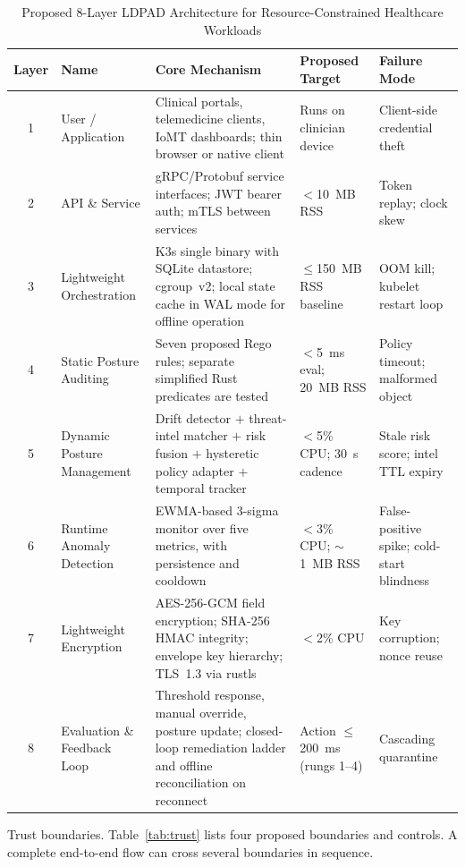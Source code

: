 \documentclass{ieeeaccess}
\renewcommand{\textbf}[1]{#1}
\begin{document}
\begin{table}[t]
\caption{Proposed 8-Layer LDPAD Architecture for Resource-Constrained Healthcare Workloads}
\label{tab:ldpadlayers}
\centering
\setlength{\tabcolsep}{4pt}
\begin{tabular}{|c|p{64pt}|p{118pt}|p{94pt}|p{62pt}|}
\hline
\textbf{Layer} & \textbf{Name} & \textbf{Core Mechanism} & \textbf{Proposed Target} & \textbf{Failure Mode} \\
\hline
1 & User / Application & Clinical portals, telemedicine clients, IoMT dashboards; thin browser or native client & Runs on clinician device & Client-side credential theft \\
\hline
2 & API \& Service & gRPC/Protobuf service interfaces; JWT bearer auth; mTLS between services & $<$10~MB RSS & Token replay; clock skew \\
\hline
3 & Lightweight Orchestration & K3s single binary with SQLite datastore; cgroup~v2; local state cache in WAL mode for offline operation & $\leq$150~MB RSS baseline & OOM kill; kubelet restart loop \\
\hline
4 & Static Posture Auditing & Seven proposed Rego rules; separate simplified Rust predicates are tested & $<$5~ms eval; 20~MB RSS & Policy timeout; malformed object \\
\hline
5 & Dynamic Posture Management & Drift detector $+$ threat-intel matcher $+$ risk fusion $+$ hysteretic policy adapter $+$ temporal tracker & $<$5\% CPU; 30~s cadence & Stale risk score; intel TTL expiry \\
\hline
6 & Runtime Anomaly Detection & EWMA-based 3-sigma monitor over five metrics, with persistence and cooldown & $<$3\% CPU; $\sim$1~MB RSS & False-positive spike; cold-start blindness \\
\hline
7 & Lightweight Encryption & AES-256-GCM field encryption; SHA-256 HMAC integrity; envelope key hierarchy; TLS~1.3 via rustls & $<$2\% CPU & Key corruption; nonce reuse \\
\hline
8 & Evaluation \& Feedback Loop & Threshold response, manual override, posture update; closed-loop remediation ladder and offline reconciliation on reconnect & Action $\leq$200~ms (rungs 1--4) & Cascading quarantine \\
\hline
\end{tabular}
\end{table}

\noindent\textbf{Trust boundaries.} Table~\ref{tab:trust} lists four proposed boundaries and controls. A complete end-to-end flow can cross several boundaries in sequence.
\end{document}
